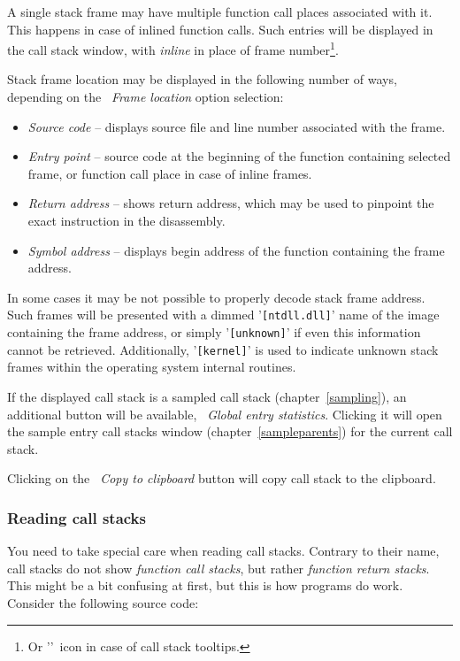 \documentclass[hidelinks,titlepage,a4paper]{article}
\begin{document}
A single stack frame may have multiple function call places associated with it. This happens in case of inlined function calls. Such entries will be displayed in the call stack window, with \emph{inline} in place of frame number\footnote{Or '\faCaretRight{}'~icon in case of call stack tooltips.}.

Stack frame location may be displayed in the following number of ways, depending on the \emph{\faAt{}~Frame location} option selection:

\begin{itemize}
\item \emph{Source code} -- displays source file and line number associated with the frame.
\item \emph{Entry point} -- source code at the beginning of the function containing selected frame, or function call place in case of inline frames.
\item \emph{Return address} -- shows return address, which may be used to pinpoint the exact instruction in the disassembly.
\item \emph{Symbol address} -- displays begin address of the function containing the frame address.
\end{itemize}

In some cases it may be not possible to properly decode stack frame address. Such frames will be presented with a dimmed '\texttt{[ntdll.dll]}' name of the image containing the frame address, or simply '\texttt{[unknown]}' if even this information cannot be retrieved. Additionally, '\texttt{[kernel]}' is used to indicate unknown stack frames within the operating system internal routines.

If the displayed call stack is a sampled call stack (chapter~\ref{sampling}), an additional button will be available, \emph{\faDoorOpen{}~Global entry statistics}. Clicking it will open the sample entry call stacks window (chapter~\ref{sampleparents}) for the current call stack.

Clicking on the \emph{\faClipboard{}~Copy to clipboard} button will copy call stack to the clipboard.

\subsubsection{Reading call stacks}
\label{readingcallstacks}

You need to take special care when reading call stacks. Contrary to their name, call stacks do not show \emph{function call stacks}, but rather \emph{function return stacks}. This might be a bit confusing at first, but this is how programs do work. Consider the following source code:
\end{document}
